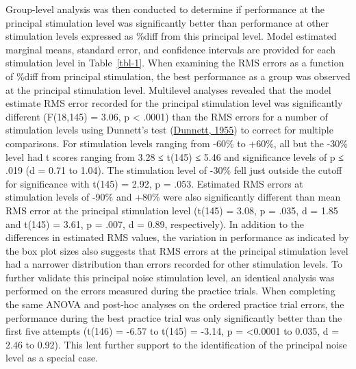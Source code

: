 \documentclass[]{cik}%
\begin{document}
Group-level analysis was then conducted to determine if performance at
the principal stimulation level was significantly better than
performance at other stimulation levels expressed as \%diff from this
principal level. Model estimated marginal means, standard error, and
confidence intervals are provided for each stimulation level in
Table~\ref{tbl-1}. When examining the RMS errors as a function of \%diff
from principal stimulation, the best performance as a group was observed
at the principal stimulation level. Multilevel analyses revealed that
the model estimate RMS error recorded for the principal stimulation
level was significantly different (F(18,145) = 3.06, p \textless{}
.0001) than the RMS errors for a number of stimulation levels using
Dunnett's test (\protect\hyperlink{ref-dunnett1955}{Dunnett, 1955}) to
correct for multiple comparisons. For stimulation levels ranging from
-60\% to +60\%, all but the -30\% level had t scores ranging from 3.28 ≤
t(145) ≤ 5.46 and significance levels of p ≤ .019 (d = 0.71 to 1.04).
The stimulation level of -30\% fell just outside the cutoff for
significance with t(145) = 2.92, p = .053. Estimated RMS errors at
stimulation levels of -90\% and +80\% were also significantly different
than mean RMS error at the principal stimulation level (t(145) = 3.08, p
= .035, d = 1.85 and t(145) = 3.61, p = .007, d = 0.89, respectively).
In addition to the differences in estimated RMS values, the variation in
performance as indicated by the box plot sizes also suggests that RMS
errors at the principal stimulation level had a narrower distribution
than errors recorded for other stimulation levels. To further validate
this principal noise stimulation level, an identical analysis was
performed on the errors measured during the practice trials. When
completing the same ANOVA and post-hoc analyses on the ordered practice
trial errors, the performance during the best practice trial was only
significantly better than the first five attempts (t(146) = -6.57 to
t(145) = -3.14, p = \textless0.0001 to 0.035, d = 2.46 to 0.92). This
lent further support to the identification of the principal noise level
as a special case.
\end{document}
